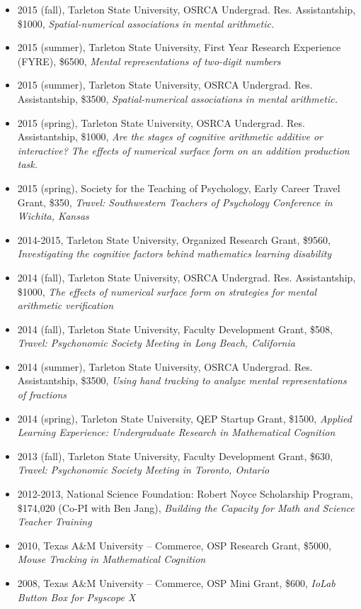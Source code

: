 \documentclass[article,10pt]{article}
\begin{document}
\begin{itemize}
\item 2015 (fall), Tarleton State University, OSRCA Undergrad. Res. Assistantship, \$1000, \emph{Spatial-numerical associations in mental arithmetic.}
\item 2015 (summer), Tarleton State University, First Year Research Experience (FYRE), \$6500, \emph{Mental representations of two-digit numbers}
\item 2015 (summer), Tarleton State University, OSRCA Undergrad. Res. Assistantship, \$3500, \emph{Spatial-numerical associations in mental arithmetic.}
\item 2015 (spring), Tarleton State University, OSRCA Undergrad. Res. Assistantship, \$1000, \emph{Are the stages of cognitive arithmetic additive or interactive? The effects of numerical surface form on an addition production task.}
\item 2015 (spring), Society for the Teaching of Psychology, Early Career Travel Grant, \$350, \emph{Travel: Southwestern Teachers of Psychology Conference in Wichita, Kansas}
\item 2014-2015, Tarleton State University, Organized Research Grant, \$9560, \emph{Investigating the cognitive factors behind mathematics learning disability}
\item 2014 (fall), Tarleton State University, OSRCA Undergrad. Res. Assistantship, \$1000, \emph{The effects of numerical surface form on strategies for mental arithmetic verification}
\item 2014 (fall), Tarleton State University, Faculty Development Grant, \$508, \emph{Travel: Psychonomic Society Meeting in Long Beach, California}
\item 2014 (summer), Tarleton State University, OSRCA Undergrad. Res. Assistantship, \$3500, \emph{Using hand tracking to analyze mental representations of fractions}
\item 2014 (spring), Tarleton State University, QEP Startup Grant, \$1500, \emph{Applied Learning Experience: Undergraduate Research in Mathematical Cognition}
\item 2013 (fall), Tarleton State University, Faculty Development Grant, \$630, \emph{Travel: Psychonomic Society Meeting in Toronto, Ontario}
\item 2012-2013, National Science Foundation: Robert Noyce Scholarship Program, \$174,020 (Co-PI with Ben Jang), \emph{Building the Capacity for Math and Science Teacher Training}
\item 2010, Texas A\&M University – Commerce, OSP Research Grant, \$5000, \emph{Mouse Tracking in Mathematical Cognition}
\item 2008, Texas A\&M University – Commerce, OSP Mini Grant, \$600, \emph{IoLab Button Box for Psyscope X}
\end{itemize}
\end{document}
